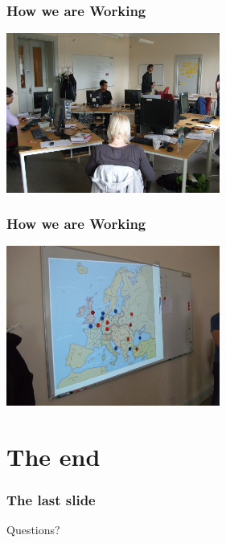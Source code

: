 \documentclass{beamer}
\begin{document}
\begin{frame}
  \frametitle{How we are Working}
  \begin{center}
   \includegraphics[width=7cm]{images/diplomacy/DSCF6548.jpg}
  \end{center}
\end{frame}

\begin{frame}
  \frametitle{How we are Working}
  \begin{center}
   \includegraphics[width=7cm]{images/diplomacy/DSCF6547.jpg}
  \end{center}
\end{frame}

\section{The end}

\begin{frame}
  \frametitle{The last slide}
  \begin{center}
	\huge{Questions?}
  \end{center}
\end{frame}
\end{document}
